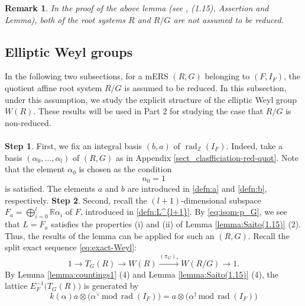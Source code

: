 \documentclass[11pt]{amsart}
\newcommand{\R}{\mathbb{R}}
\newcommand{\Z}{\mathbb{Z}}
\newtheorem{rem}[thm]{Remark}%
\newcommand{\rad}{\operatorname{rad}}
\begin{document}
{\begin{rem}{\rm
In the proof of the above lemma (see \cite{Saito1985}, (1.15), 
Assertion and Lemma), both of the root systems $R$ and $R/G$ 
are not assumed to be reduced. 
}\end{rem}

\subsection{Elliptic Weyl groups}\label{sect:Weyl1}
In  the following two subsections, for a mERS $(R,G)$ belonging to $(F,I_F)$, 
the quotient affine root system $R/G$ is assumed to be reduced. 
In this subsection, under this assumption, we {study 
the explicit structure of the elliptic Weyl group $W(R)$. These results will be used in
Part 2 for studying the case that $R/G$ is non-reduced.} \\
\\
{\bf Step 1}. First, we fix an integral basis $(b,a)$ of $\rad_\Z(I_F)$. Indeed, take a basis $(\alpha_0,\ldots,\alpha_l)$ of 
$(R,G)$ as in Appendix \ref{sect_clasfficiation-red-quot}. Note that the element
$\alpha_0$ is chosen as the condition
\begin{equation*}\label{cond:n_0=1}
n_0=1
\end{equation*}
is satisfied. The elements $a$ and $b$ are introduced in \eqref{defn:a} and 
\eqref{defn:b}, respectively. 
\vskip 3mm
\noindent
{\bf Step 2}.
Second, recall the $(l+1)$-dimensional subspace $F_a=\bigoplus_{i=0}^l \R\alpha_i$
of $F$,  introduced in \eqref{defn:L^{l+1}}. By \eqref{eq:isom-p_G}, we see 
that $L=F_a$ satisfies the properties {\rm (i)} and {\rm (ii)} 
of Lemma \ref{lemma:Saito(1.15)} {\rm (2)}. 
Thus, the results of the lemma can be applied for such an $(R,G)$. Recall 
the split exact sequence \eqref{eq:exact-Weyl}:
\begin{equation*}
1 \longrightarrow T_G(R)\longrightarrow W(R) \xrightarrow{(\pi_G)_*} W(R/G) 
\longrightarrow 1.
\end{equation*}
By Lemma \ref{lemma:countings1} (4) and Lemma
\ref{lemma:Saito(1.15)} {\rm (4)}, the lattice $E_F^{-1}\big(T_G(R)\big)$ is generated by
\[k(\alpha)a\otimes \big(\alpha^\vee\,\mathrm{mod}\,\rad (I_F)\big)
=a\otimes \big(\alpha^\dagger\,\mathrm{mod}\,\rad (I_F)\big)
\]}
\end{document}
